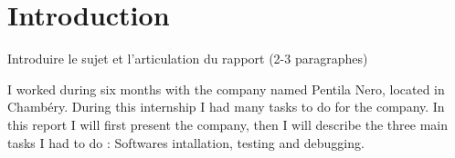
\section*{Introduction}
Introduire le sujet et l’articulation du rapport (2-3 paragraphes)

I worked during six months with the company named Pentila Nero, located in Chambéry. 
During this internship I had many tasks to do for the company. 
In this report I will first present the company, then I will describe the three main tasks I had to do : Softwares intallation, testing and debugging.  
